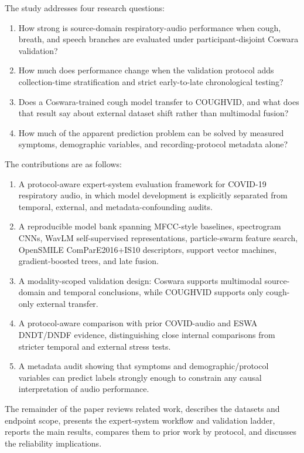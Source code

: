 \documentclass[preprint,12pt]{elsarticle}
\begin{document}
The study addresses four research questions:
\begin{enumerate}
\item How strong is source-domain respiratory-audio performance when cough, breath, and speech branches are evaluated under participant-disjoint Coswara validation?
\item How much does performance change when the validation protocol adds collection-time stratification and strict early-to-late chronological testing?
\item Does a Coswara-trained cough model transfer to COUGHVID, and what does that result say about external dataset shift rather than multimodal fusion?
\item How much of the apparent prediction problem can be solved by measured symptoms, demographic variables, and recording-protocol metadata alone?
\end{enumerate}

The contributions are as follows:
\begin{enumerate}
\item A protocol-aware expert-system evaluation framework for COVID-19 respiratory audio, in which model development is explicitly separated from temporal, external, and metadata-confounding audits.
\item A reproducible model bank spanning MFCC-style baselines, spectrogram CNNs, WavLM self-supervised representations, particle-swarm feature search, OpenSMILE ComParE2016+IS10 descriptors, support vector machines, gradient-boosted trees, and late fusion.
\item A modality-scoped validation design: Coswara supports multimodal source-domain and temporal conclusions, while COUGHVID supports only cough-only external transfer.
\item A protocol-aware comparison with prior COVID-audio and ESWA DNDT/DNDF evidence, distinguishing close internal comparisons from stricter temporal and external stress tests.
\item A metadata audit showing that symptoms and demographic/protocol variables can predict labels strongly enough to constrain any causal interpretation of audio performance.
\end{enumerate}

The remainder of the paper reviews related work, describes the datasets and endpoint scope, presents the expert-system workflow and validation ladder, reports the main results, compares them to prior work by protocol, and discusses the reliability implications.
\end{document}
